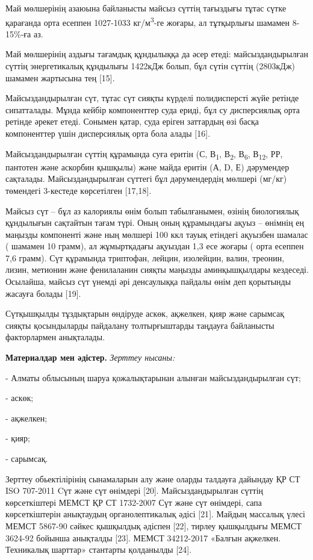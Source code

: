 \begin{multicols}{2}
Май мөлшерінің азаюына байланысты майсыз сүттің тағыздығы тұтас сүтке
қарағанда орта есеппен 1027-1033 кг/м\textsuperscript{3}-ге жоғары, ал
тұтқырлығы шамамен 8-15\%-ға аз.

Май мөлшерінің аздығы тағамдық құндылыққа да әсер етеді:
майсыздандырылған сүттің энергетикалық құндылығы 1422кДж болып, бұл
сүтін сүттің (2803кДж) шамамен жартысына тең {[}15{]}.

Майсыздандырылған сүт, тұтас сүт сияқты күрделі полидисперсті жүйе
ретінде сипатталады. Мұнда кейбір компоненттер суда ериді, бұл су
дисперсиялық орта ретінде әрекет етеді. Сонымен қатар, суда еріген
заттардың өзі басқа компоненттер үшін дисперсиялық орта бола алады
{[}16{]}.

Майсыздандырылған сүттің құрамында суға еритін (С, В\textsubscript{1},
В\textsubscript{2}, В\textsubscript{6}, В\textsubscript{12}, РР,
пантотен және аскорбин қышқылы) және майда еритін (А, D, Е) дәрумендер
сақталады. Майсыздандырылған сүттегі бұл дәрумендердің мөлшері (мг/кг)
төмендегі 3-кестеде көрсетілген {[}17,18{]}.

Майсыз сүт -- бұл аз калориялы өнім болып табылғанымен, өзінің
биологиялық құндылығын сақтайтын тағам түрі. Оның оның құрамындағы ақуыз
-- өнімнің ең маңызды компоненті және ның мөлшері 100 ккл тауық етіндегі
ақуызбен шамалас ( шамамен 10 грамм), ал жұмыртқадағы ақуыздан 1,3 есе
жоғары ( орта есеппен 7,6 грамм). Сүт құрамында триптофан, лейцин,
изолейцин, валин, треонин, лизин, метионин және фенилаланин сияқты
маңызды аминқышқылдары кездеседі. Осылайша, майсыз сүт үнемді әрі
денсаулыққа пайдалы өнім деп қорытынды жасауға болады {[}19{]}.

Сүтқышқылды тұздықтарын өндіруде аскөк, ақжелкен, қияр және сарымсақ
сияқты қосындыларды пайдалану толтырғыштарды таңдауға байланысты
факторлармен анықталады.

{\bfseries Материалдар мен әдістер.} \emph{Зерттеу нысаны:}

- Алматы облысының шаруа қожалықтарынан алынған майсыздандырылған сүт;

- аскөк;

- ақжелкен;

- қияр;

- сарымсақ.

Зерттеу обьектілірінің сынамаларын алу және оларды талдауға дайындау ҚР
СТ ISO 707-2011 Cүт және сүт өнімдері {[}20{]}. Майсыздандырылған сүттің
көрсеткіштері МЕМСТ ҚР СТ 1732-2007 Сүт және сүт өнімдері, сапа
көрсеткіштерін анықтаудың органолептикалық әдісі {[}21{]}. Майдың
массалық үлесі МЕМСТ 5867-90 сәйкес қышқылдық әдіспен {[}22{]}, тирлеу
қышқылдығы МЕМСТ 3624-92 бойынша анықталды {[}23{]}. МЕМСТ 34212-2017
«Балғын ақжелкен. Техникалық шарттар» стантарты қолданылды {[}24{]}.


\end{multicols}
